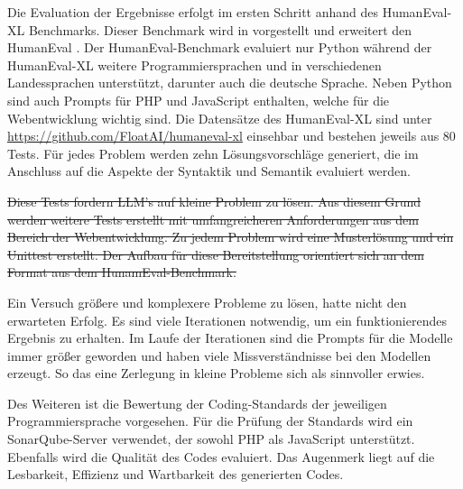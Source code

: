 Die Evaluation der Ergebnisse erfolgt im ersten Schritt anhand des HumanEval-XL Benchmarks. Dieser Benchmark wird in \cite{peng-2024} vorgestellt und erweitert den HumanEval \cite{chen-2021}. Der HumanEval-Benchmark evaluiert nur Python während der HumanEval-XL weitere Programmiersprachen und in verschiedenen Landessprachen unterstützt, darunter auch die deutsche Sprache. Neben Python sind auch Prompts für PHP und JavaScript enthalten, welche für die Webentwicklung wichtig sind. Die Datensätze des HumanEval-XL sind unter \href{https://github.com/FloatAI/humaneval-xl}{https://github.com/FloatAI/humaneval-xl} einsehbar und bestehen jeweils aus 80 Tests. Für jedes Problem werden zehn Lösungsvorschläge generiert, die im Anschluss auf die Aspekte der Syntaktik und Semantik evaluiert werden.\vspace{0.2cm}

\sout{Diese Tests fordern LLM's auf kleine Problem zu lösen. Aus diesem Grund werden weitere Tests erstellt mit umfangreicheren Anforderungen aus dem Bereich der Webentwicklung. Zu jedem Problem wird eine Musterlösung und ein Unittest erstellt. Der Aufbau für diese Bereitstellung orientiert sich an dem Format aus dem HunamEval-Benchmark.}\vspace{0.2cm}

Ein Versuch größere und komplexere Probleme zu lösen, hatte nicht den erwarteten Erfolg. Es sind viele Iterationen notwendig, um ein funktionierendes Ergebnis zu erhalten. Im Laufe der Iterationen sind die Prompts für die Modelle immer größer geworden und haben viele Missverständnisse bei den Modellen erzeugt. So das eine Zerlegung in kleine Probleme sich als sinnvoller erwies.\vspace{0.2cm}

Des Weiteren ist die Bewertung der Coding-Standards der jeweiligen Programmiersprache vorgesehen. Für die Prüfung der Standards wird ein SonarQube-Server verwendet, der sowohl PHP als JavaScript unterstützt. Ebenfalls wird die Qualität des Codes evaluiert. Das Augenmerk liegt auf die Lesbarkeit, Effizienz und Wartbarkeit des generierten Codes.\vspace{0.2cm}



